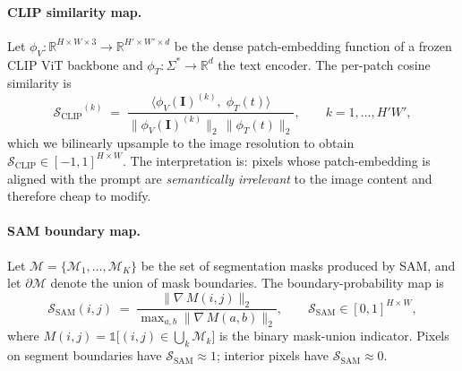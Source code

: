 \documentclass[10pt,a4paper]{article}
\newcommand{\R}{\mathbb{R}}
\newcommand{\cover}{\mathbf{I}}
\newcommand{\Mc}{\mathcal{M}}
\newcommand{\ScC}{\mathcal{S}_{\mathrm{CLIP}}}
\newcommand{\Ss}{\mathcal{S}_{\mathrm{SAM}}}
\begin{document}
\paragraph{CLIP similarity map.}
Let $\phi_V: \R^{H \times W \times 3} \to \R^{H' \times W' \times d}$ be
the dense patch-embedding function of a frozen CLIP ViT
backbone and $\phi_T: \Sigma^* \to \R^d$ the text encoder. The per-patch
cosine similarity is
\begin{equation}
{\ScC}^{(k)} \;=\; \frac{\langle \phi_V(\cover)^{(k)},\; \phi_T(t) \rangle}
                       {\|\phi_V(\cover)^{(k)}\|_2 \, \|\phi_T(t)\|_2},
\qquad k = 1, \ldots, H'W',
\label{eq:clip-sim}
\end{equation}
which we bilinearly upsample to the image resolution to obtain
$\ScC \in [-1, 1]^{H \times W}$. The interpretation is: pixels whose
patch-embedding is aligned with the prompt are \emph{semantically
irrelevant} to the image content and therefore cheap to modify.

\paragraph{SAM boundary map.}
Let $\Mc = \{\Mc_1, \ldots, \Mc_K\}$ be the set of segmentation masks
produced by SAM, and let $\partial \Mc$ denote the union of mask
boundaries. The boundary-probability map is
\begin{equation}
{\Ss}(i,j) \;=\; \frac{\bigl\| \nabla \, M(i,j) \bigr\|_2}
                       {\max\nolimits_{a,b} \bigl\| \nabla \, M(a,b) \bigr\|_2},
\qquad \Ss \in [0, 1]^{H \times W},
\label{eq:sam-bnd}
\end{equation}
where $M(i,j) = \mathbb{1}\!\bigl[(i,j) \in \bigcup\nolimits_{k} \Mc_k\bigr]$
is the binary mask-union indicator.  Pixels on segment boundaries have
$\Ss \approx 1$; interior pixels have $\Ss \approx 0$.
\end{document}
